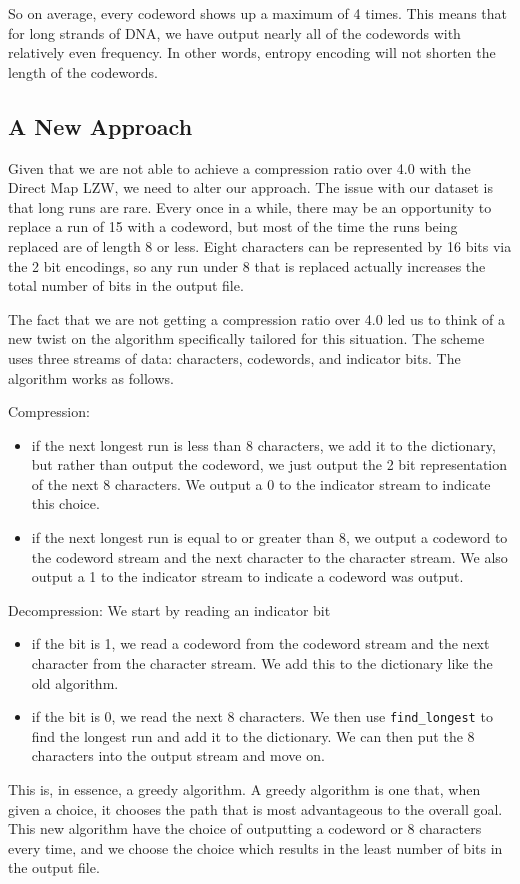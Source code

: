 \documentclass[12pt,twoside]{reedthesis}
\providecommand{\tightlist}{%
  \setlength{\itemsep}{0pt}\setlength{\parskip}{0pt}}
\begin{document}
So on average, every codeword shows up a maximum of 4 times. This means that for long strands of DNA, we have output nearly all of the codewords with relatively even frequency. In other words, entropy encoding will not shorten the length of the codewords.

\hypertarget{a-new-approach}{%
\subsection{A New Approach}\label{a-new-approach}}

Given that we are not able to achieve a compression ratio over 4.0 with the Direct Map LZW, we need to alter our approach. The issue with our dataset is that long runs are rare. Every once in a while, there may be an opportunity to replace a run of 15 with a codeword, but most of the time the runs being replaced are of length 8 or less. Eight characters can be represented by 16 bits via the 2 bit encodings, so any run under 8 that is replaced actually increases the total number of bits in the output file.

The fact that we are not getting a compression ratio over 4.0 led us to think of a new twist on the algorithm specifically tailored for this situation. The scheme uses three streams of data: characters, codewords, and indicator bits. The algorithm works as follows.

Compression:
\begin{itemize}
\tightlist
\item
  if the next longest run is less than 8 characters, we add it to the dictionary, but rather than output the codeword, we just output the 2 bit representation of the next 8 characters. We output a 0 to the indicator stream to indicate this choice.
\item
  if the next longest run is equal to or greater than 8, we output a codeword to the codeword stream and the next character to the character stream. We also output a 1 to the indicator stream to indicate a codeword was output.
\end{itemize}
Decompression: We start by reading an indicator bit
\begin{itemize}
\tightlist
\item
  if the bit is 1, we read a codeword from the codeword stream and the next character from the character stream. We add this to the dictionary like the old algorithm.
\item
  if the bit is 0, we read the next 8 characters. We then use \texttt{find\_longest} to find the longest run and add it to the dictionary. We can then put the 8 characters into the output stream and move on.
\end{itemize}
This is, in essence, a greedy algorithm. A greedy algorithm is one that, when given a choice, it chooses the path that is most advantageous to the overall goal. This new algorithm have the choice of outputting a codeword or 8 characters every time, and we choose the choice which results in the least number of bits in the output file.
\end{document}
